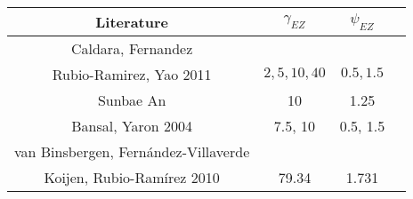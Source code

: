 \documentclass[document.tex]{subfiles}
\begin{document}
\begin{table}[H]
\begin{tabular}{cccc}
\toprule
Literature & $\gamma_{EZ}$ & $\psi_{EZ}$ \\ \hline
Caldara, Fernandez& & \\
Rubio-Ramirez, Yao 2011 & ${ 2, 5, 10, 40} $& ${0.5, 1.5}$\\
Sunbae An  & 10 & 1.25 \\
Bansal, Yaron 2004 & 7.5, 10 & 0.5, 1.5\\ 
van Binsbergen, Fernández-Villaverde & & \\
Koijen, Rubio-Ramírez 2010 & 79.34 & 1.731 \\
\bottomrule
\end{tabular}
\end{table}

\begin{comment}
$h$ 			& $0<h<1	$	& Habit parameter & 0.815\\
$\chi$ 			& $0<\chi$	&Relative utility weight of labor & 3.409\\
$\varphi$ 	& $0<\varphi$	&Inverse Frisch elasticity of labor & 0.276\\
\end{comment}
\end{document}
